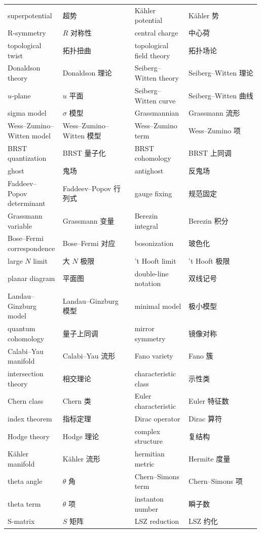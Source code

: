 \begin{longtable}{@{}p{0.215\linewidth}p{0.28\linewidth}p{0.215\linewidth}p{0.28\linewidth}@{}}
superpotential & 超势 & Kähler potential & Kähler 势 \\
R-symmetry & $R$ 对称性 & central charge & 中心荷 \\
topological twist & 拓扑扭曲 & topological field theory & 拓扑场论 \\
Donaldson theory & Donaldson 理论 & Seiberg--Witten theory & Seiberg--Witten 理论 \\
$u$-plane & $u$ 平面 & Seiberg--Witten curve & Seiberg--Witten 曲线 \\
sigma model & $\sigma$ 模型 & Grassmannian & Grassmann 流形 \\
Wess--Zumino--Witten model & Wess--Zumino--Witten 模型 & Wess--Zumino term & Wess--Zumino 项 \\
BRST quantization & BRST 量子化 & BRST cohomology & BRST 上同调 \\
ghost & 鬼场 & antighost & 反鬼场 \\
Faddeev--Popov determinant & Faddeev--Popov 行列式 & gauge fixing & 规范固定 \\
Grassmann variable & Grassmann 变量 & Berezin integral & Berezin 积分 \\
Bose--Fermi correspondence & Bose--Fermi 对应 & bosonization & 玻色化 \\
large $N$ limit & 大 $N$ 极限 & 't Hooft limit & 't Hooft 极限 \\
planar diagram & 平面图 & double-line notation & 双线记号 \\
Landau--Ginzburg model & Landau--Ginzburg 模型 & minimal model & 极小模型 \\
quantum cohomology & 量子上同调 & mirror symmetry & 镜像对称 \\
Calabi--Yau manifold & Calabi--Yau 流形 & Fano variety & Fano 簇 \\
intersection theory & 相交理论 & characteristic class & 示性类 \\
Chern class & Chern 类 & Euler characteristic & Euler 特征数 \\
index theorem & 指标定理 & Dirac operator & Dirac 算符 \\
Hodge theory & Hodge 理论 & complex structure & 复结构 \\
Kähler manifold & Kähler 流形 & hermitian metric & Hermite 度量 \\
theta angle & $\theta$ 角 & Chern--Simons term & Chern--Simons 项 \\
theta term & $\theta$ 项 & instanton number & 瞬子数 \\
S-matrix & $S$ 矩阵 & LSZ reduction & LSZ 约化 \\

\end{longtable}
